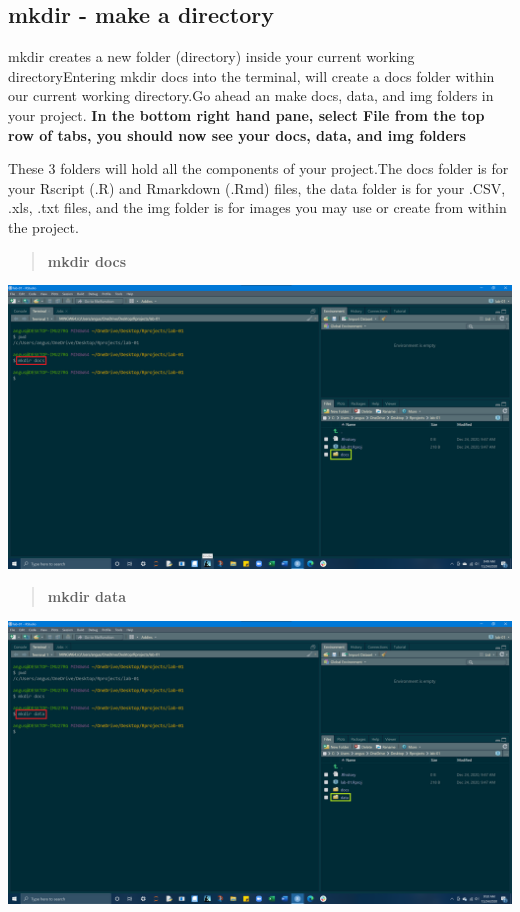 \documentclass[
]{article}
\begin{document}
\hypertarget{mkdir---make-a-directory}{%
\subsection{\texorpdfstring{{mkdir} - make a
directory}{mkdir - make a directory}}\label{mkdir---make-a-directory}}

mkdir creates a new folder (directory) inside your current working
directoryEntering {mkdir docs} into the terminal, will create a docs
folder within our current working directory.Go ahead an make docs, data,
and img folders in your project. \textbf{In the bottom right hand pane,
select File from the top row of tabs, you should now see your docs,
data, and img folders}

These 3 folders will hold all the components of your project.The docs
folder is for your Rscript (.R) and Rmarkdown (.Rmd) files, the data
folder is for your .CSV, .xls, .txt files, and the img folder is for
images you may use or create from within the project.

\begin{quote}
\textbf{mkdir docs}
\end{quote}

\includegraphics{img/mkdir-docs.png}

\begin{quote}
\textbf{mkdir data}
\end{quote}

\includegraphics{img/mkdir-data.png}
\end{document}
